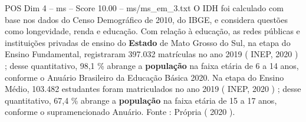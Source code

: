\begin{textsample}{POS Dim 4 – ms – Score 10.00 – ms/ms\_em\_3.txt}
O IDH foi calculado com base nos dados do Censo Demográfico de 2010, do IBGE, e considera questões como longevidade, renda e educação.
Com relação à educação, as redes públicas e instituições privadas de ensino do \textbf{Estado} de Mato Grosso do Sul, na etapa do Ensino Fundamental, registraram 397.032 matrículas no ano 2019 ( INEP, 2020 ) ; desse quantitativo, 98,1 \% abrange a \textbf{população} na faixa etária de 6 a 14 anos, conforme o Anuário Brasileiro da Educação Básica 2020.
Na etapa do Ensino Médio, 103.482 estudantes foram matriculados no ano 2019 ( INEP, 2020 ) ; desse quantitativo, 67,4 \% abrange a \textbf{população} na faixa etária de 15 a 17 anos, conforme o supramencionado Anuário.
Fonte : Própria ( 2020 ).

\end{textsample}
